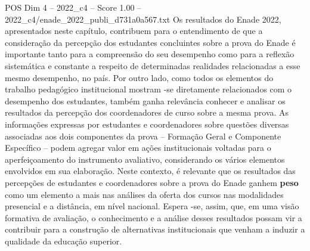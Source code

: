 \begin{textsample}{POS Dim 4 – 2022\_c4 – Score 1.00 – 2022\_c4/enade\_2022\_publi\_d731a0a567.txt}
Os resultados do Enade 2022, apresentados neste capítulo, contribuem para o entendimento de que a consideração da percepção dos estudantes concluintes sobre a prova do Enade é importante tanto para a compreensão do seu desempenho como para a reflexão sistemática e constante a respeito de determinadas realidades relacionadas a esse mesmo desempenho, no país.
Por outro lado, como todos os elementos do trabalho pedagógico institucional mostram -se diretamente relacionados com o desempenho dos estudantes, também ganha relevância conhecer e analisar os resultados da percepção dos coordenadores de curso sobre a mesma prova.
As informações expressas por estudantes e coordenadores sobre questões diversas associadas aos dois componentes da prova – Formação Geral e Componente Específico – podem agregar valor em ações institucionais voltadas para o aperfeiçoamento do instrumento avaliativo, considerando os vários elementos envolvidos em sua elaboração.
Neste contexto, é relevante que os resultados das percepções de estudantes e coordenadores sobre a prova do Enade ganhem \textbf{peso} como um elemento a mais nas análises da oferta dos cursos nas modalidades presencial e a distância, em nível nacional.
Espera -se, assim, que, em uma visão formativa de avaliação, o conhecimento e a análise desses resultados possam vir a contribuir para a construção de alternativas institucionais que venham a induzir a qualidade da educação superior.

\end{textsample}
